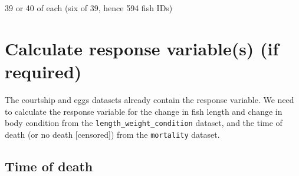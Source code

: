\documentclass[]{book}
\newenvironment{Shaded}{\begin{snugshade}}{\end{snugshade}}
\newcommand{\DataTypeTok}[1]{\textcolor[rgb]{0.13,0.29,0.53}{#1}}
\newcommand{\DecValTok}[1]{\textcolor[rgb]{0.00,0.00,0.81}{#1}}
\newcommand{\KeywordTok}[1]{\textcolor[rgb]{0.13,0.29,0.53}{\textbf{#1}}}
\newcommand{\NormalTok}[1]{#1}
\newcommand{\OperatorTok}[1]{\textcolor[rgb]{0.81,0.36,0.00}{\textbf{#1}}}
\newcommand{\OtherTok}[1]{\textcolor[rgb]{0.56,0.35,0.01}{#1}}
\newcommand{\StringTok}[1]{\textcolor[rgb]{0.31,0.60,0.02}{#1}}
\begin{document}
39 or 40 of each (six of 39, hence 594 fish IDs)

\hypertarget{calculate-response-variables-if-required}{%
\section{Calculate response variable(s) (if required)}\label{calculate-response-variables-if-required}}

The courtship and eggs datasets already contain the response variable.
We need to calculate the response variable for the change in fish length and change in body condition from the \texttt{length\_weight\_condition} dataset, and the time of death (or no death {[}censored{]}) from the \texttt{mortality} dataset.

\hypertarget{time-of-death}{%
\subsection{Time of death}\label{time-of-death}}

\begin{Shaded}
\end{Shaded}
\end{document}
